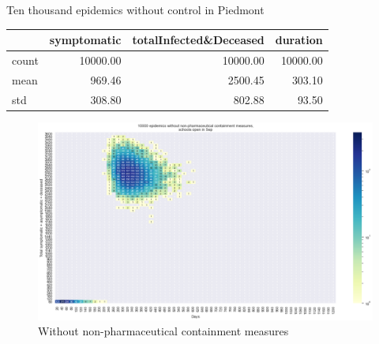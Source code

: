 \documentclass[8pt]{beamer}
\begin{document}
\begin{frame}{Ten thousand epidemics without control in Piedmont}


\begin{table}[H]
\center
\tiny

\begin{tabular}{lrrr}
\toprule
{} &  symptomatic &  totalInfected\&Deceased &  duration \\
\midrule
count &     10000.00 &                10000.00 &  10000.00 \\
mean  &       969.46 &                 2500.45 &    303.10 \\
std   &       308.80 &                  802.88 &     93.50 \\
\bottomrule
\end{tabular}

\label{noCTab}
\end{table}

\begin{figure}[H]
\center
\includegraphics[scale=0.22]{10kNoControl.png}
\caption{Without non-pharmaceutical containment measures} 
\label{noC}
\end{figure}

\end{frame}
\end{document}
